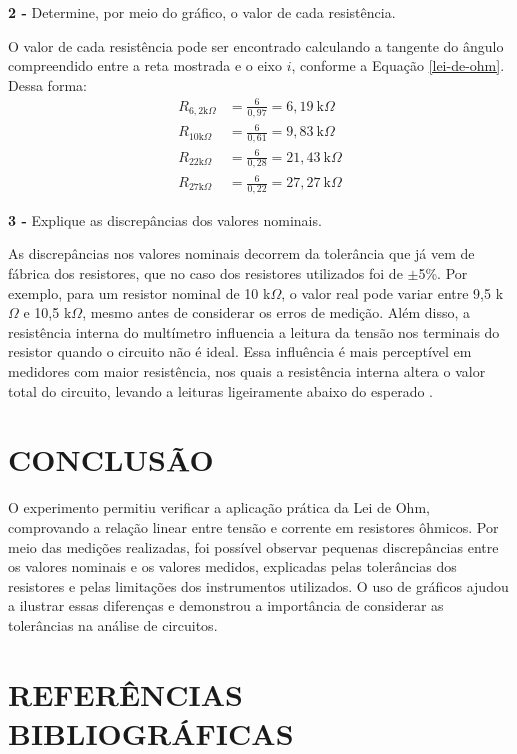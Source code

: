 \documentclass[12pt]{article}
\begin{document}
\noindent\textbf{2 - }Determine, por meio do gráfico, o valor de cada resistência.

O valor de cada resistência pode ser encontrado calculando a tangente do ângulo compreendido entre a reta mostrada e o eixo $i$, conforme a Equação \ref{lei-de-ohm}. Dessa forma:
\begin{align*}
    R_{6,2\text{k}\Omega}&=\frac{6}{0,97}= 6,19\ \text{k}\Omega \\
    R_{10\text{k}\Omega}&=\frac{6}{0,61}= 9,83\ \text{k}\Omega \\
    R_{22\text{k}\Omega}&=\frac{6}{0,28}= 21,43\ \text{k}\Omega \\
    R_{27\text{k}\Omega}&=\frac{6}{0,22}= 27,27\ \text{k}\Omega
\end{align*}

\noindent\textbf{3 - }Explique as discrepâncias dos valores nominais.

As discrepâncias nos valores nominais decorrem da tolerância que já vem de fábrica dos resistores, que no caso dos resistores utilizados foi de $\pm$5\%. Por exemplo, para um resistor nominal de 10 k$\Omega$, o valor real pode variar entre 9,5 k$\Omega$ e 10,5 k$\Omega$, mesmo antes de considerar os erros de medição. Além disso, a resistência interna do multímetro influencia a leitura da tensão nos terminais do resistor quando o circuito não é ideal. Essa influência é mais perceptível em medidores com maior resistência, nos quais a resistência interna altera o valor total do circuito, levando a leituras ligeiramente abaixo do esperado \parencite[][, p. 71]{nilsson}.

\section{CONCLUSÃO}
O experimento permitiu verificar a aplicação prática da Lei de Ohm, comprovando a relação linear entre tensão e corrente em resistores ôhmicos. Por meio das medições realizadas, foi possível observar pequenas discrepâncias entre os valores nominais e os valores medidos, explicadas pelas tolerâncias dos resistores e pelas limitações dos instrumentos utilizados. O uso de gráficos ajudou a ilustrar essas diferenças e demonstrou a importância de considerar as tolerâncias na análise de circuitos.

\newpage
{}
\section*{\hfill REFERÊNCIAS BIBLIOGRÁFICAS\hfill}
\printbibliography[heading=none]
\end{document}
